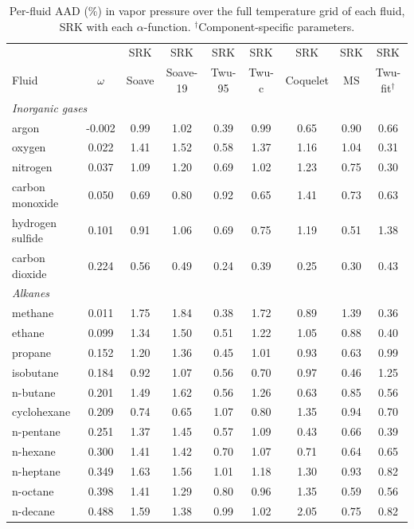\begin{table}[H]
\centering
\caption{Per-fluid AAD (\%) in vapor pressure over the full temperature grid of each fluid, SRK with each $\alpha$-function. $^{\dagger}$Component-specific parameters.}
\label{tab:tabS_perfluid_psat_srk}
\small
\begin{tabular}{lcccccccc}
\toprule
 &  & SRK & SRK & SRK & SRK & SRK & SRK & SRK \\
Fluid & $\omega$ & Soave & Soave-19 & Twu-95 & Twu-c & Coquelet & MS & Twu-fit$^{\dagger}$ \\
\midrule
\multicolumn{9}{l}{\emph{Inorganic gases}} \\
argon & -0.002 & 0.99 & 1.02 & 0.39 & 0.99 & 0.65 & 0.90 & 0.66 \\
oxygen & 0.022 & 1.41 & 1.52 & 0.58 & 1.37 & 1.16 & 1.04 & 0.31 \\
nitrogen & 0.037 & 1.09 & 1.20 & 0.69 & 1.02 & 1.23 & 0.75 & 0.30 \\
carbon monoxide & 0.050 & 0.69 & 0.80 & 0.92 & 0.65 & 1.41 & 0.73 & 0.63 \\
hydrogen sulfide & 0.101 & 0.91 & 1.06 & 0.69 & 0.75 & 1.19 & 0.51 & 1.38 \\
carbon dioxide & 0.224 & 0.56 & 0.49 & 0.24 & 0.39 & 0.25 & 0.30 & 0.43 \\
\multicolumn{9}{l}{\emph{Alkanes}} \\
methane & 0.011 & 1.75 & 1.84 & 0.38 & 1.72 & 0.89 & 1.39 & 0.36 \\
ethane & 0.099 & 1.34 & 1.50 & 0.51 & 1.22 & 1.05 & 0.88 & 0.40 \\
propane & 0.152 & 1.20 & 1.36 & 0.45 & 1.01 & 0.93 & 0.63 & 0.99 \\
isobutane & 0.184 & 0.92 & 1.07 & 0.56 & 0.70 & 0.97 & 0.46 & 1.25 \\
n-butane & 0.201 & 1.49 & 1.62 & 0.56 & 1.26 & 0.63 & 0.85 & 0.56 \\
cyclohexane & 0.209 & 0.74 & 0.65 & 1.07 & 0.80 & 1.35 & 0.94 & 0.70 \\
n-pentane & 0.251 & 1.37 & 1.45 & 0.57 & 1.09 & 0.43 & 0.66 & 0.39 \\
n-hexane & 0.300 & 1.41 & 1.42 & 0.70 & 1.07 & 0.71 & 0.64 & 0.65 \\
n-heptane & 0.349 & 1.63 & 1.56 & 1.01 & 1.18 & 1.30 & 0.93 & 0.82 \\
n-octane & 0.398 & 1.41 & 1.29 & 0.80 & 0.96 & 1.35 & 0.59 & 0.56 \\
n-decane & 0.488 & 1.59 & 1.38 & 0.99 & 1.02 & 2.05 & 0.75 & 0.82 \\

\end{tabular}
\end{table}
